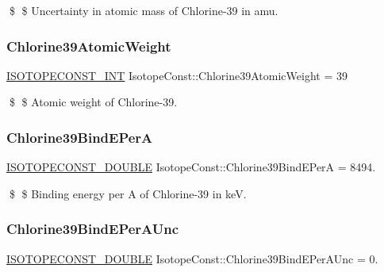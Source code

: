 \$ \$ Uncertainty in atomic mass of Chlorine-\/39 in amu. \mbox{\label{group___isotope_const-_chlorine-_cl39_ga9880ccfca351331291a60163d4ea4cc6}} 
\subsubsection{\texorpdfstring{Chlorine39\+Atomic\+Weight}{Chlorine39AtomicWeight}}
{\footnotesize\ttfamily \mbox{\hyperlink{group___isotope_const-_macros_ga5f18360b3e99483a35c32d789e62621c}{I\+S\+O\+T\+O\+P\+E\+C\+O\+N\+S\+T\+\_\+\+I\+NT}} Isotope\+Const\+::\+Chlorine39\+Atomic\+Weight = 39}

\$ \$ Atomic weight of Chlorine-\/39. \mbox{\label{group___isotope_const-_chlorine-_cl39_ga5f810bfcbf842448ce2f9d8ba3faf31e}} 
\subsubsection{\texorpdfstring{Chlorine39\+Bind\+E\+PerA}{Chlorine39BindEPerA}}
{\footnotesize\ttfamily \mbox{\hyperlink{group___isotope_const-_macros_ga8f45a7272ce02c0b4c65c44636ed719a}{I\+S\+O\+T\+O\+P\+E\+C\+O\+N\+S\+T\+\_\+\+D\+O\+U\+B\+LE}} Isotope\+Const\+::\+Chlorine39\+Bind\+E\+PerA = 8494.}

\$ \$ Binding energy per A of Chlorine-\/39 in keV. \mbox{\label{group___isotope_const-_chlorine-_cl39_ga9530e63d361145b02aa60916aa015761}} 
\subsubsection{\texorpdfstring{Chlorine39\+Bind\+E\+Per\+A\+Unc}{Chlorine39BindEPerAUnc}}
{\footnotesize\ttfamily \mbox{\hyperlink{group___isotope_const-_macros_ga8f45a7272ce02c0b4c65c44636ed719a}{I\+S\+O\+T\+O\+P\+E\+C\+O\+N\+S\+T\+\_\+\+D\+O\+U\+B\+LE}} Isotope\+Const\+::\+Chlorine39\+Bind\+E\+Per\+A\+Unc = 0.}

